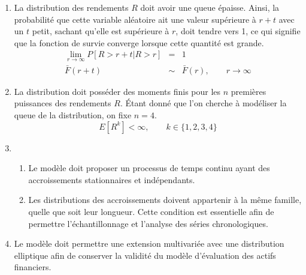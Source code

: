 \begin{enumerate}
\item La distribution des rendements $R$ doit avoir une queue
  épaisse. Ainsi, la probabilité que cette variable aléatoire ait une
  valeur supérieure à $r+t$ avec un $t$ petit, sachant qu'elle est
  supérieure à $r$, doit tendre vers 1, ce qui signifie que la
  fonction de survie converge lorsque cette quantité est grande.
  \begin{eqnarray}
    \label{eq:condmadan1}
    \lim_{r\rightarrow \infty} P\left[R > r+t | R > r \right] &=& 1 \\
    \bar{F}(r+t) &\sim& \bar{F}(r), \qquad r \rightarrow \infty \nonumber
  \end{eqnarray}
\item La distribution doit posséder des moments finis pour les $n$
  premières puissances des rendements $R$. Étant donné que l'on
  cherche à modéliser la queue de la distribution, on fixe $n=4$.
  \begin{equation}
    \label{eq:condmadan2}
    E\left[R^k\right] < \infty, \qquad k \in \lbrace 1,2,3,4 \rbrace
  \end{equation}
\item
  \begin{enumerate}
  \item Le modèle doit proposer un processus de temps continu ayant
    des accroissements stationnaires et indépendants.
  \item Les distributions des accroissements doivent appartenir à la
    même famille, quelle que soit leur longueur. Cette condition est
    essentielle afin de permettre l'échantillonnage et l'analyse des
    séries chronologiques.
  \end{enumerate}
\item Le modèle doit permettre une extension multivariée avec une
  distribution elliptique afin de conserver la validité du modèle
  d'évaluation des actifs financiers.
\end{enumerate}

